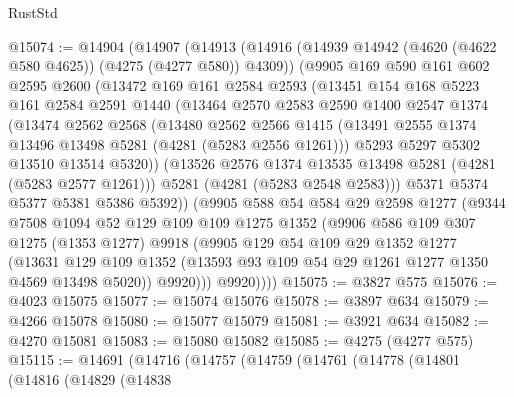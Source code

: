 \begin{lexlean}{RustStd}
\begin{coremodule}
@15074 := @14904
    (@14907
      (@14913
        (@14916 (@14939 @14942 (@4620 (@4622 @580 @4625)) (@4275 (@4277 @580)) @4309))
        (@9905
          @169
          @590
          @161
          @602
          @2595
          @2600
          (@13472
            @169
            @161
            @2584
            @2593
            (@13451
              @154
              @168
              @5223
              @161
              @2584
              @2591
              @1440
              (@13464
                @2570
                @2583
                @2590
                @1400
                @2547
                @1374
                (@13474
                  @2562
                  @2568
                  (@13480
                    @2562
                    @2566
                    @1415
                    (@13491 @2555 @1374 @13496 @13498 @5281 (@4281 (@5283 @2556 @1261)))
                    @5293
                    @5297
                    @5302
                    @13510
                    @13514
                    @5320))
                (@13526 @2576 @1374 @13535 @13498 @5281 (@4281 (@5283 @2577 @1261)))
                @5281
                (@4281 (@5283 @2548 @2583)))
              @5371
              @5374
              @5377
              @5381
              @5386
              @5392))
          (@9905
            @588
            @54
            @584
            @29
            @2598
            @1277
            (@9344
              @7508
              @1094
              @52
              @129
              @109
              @109
              @1275
              @1352
              (@9906
                @586
                @109
                @307
                @1275
                (@1353 @1277)
                @9918
                (@9905
                  @129
                  @54
                  @109
                  @29
                  @1352
                  @1277
                  (@13631
                    @129
                    @109
                    @1352
                    (@13593 @93 @109 @54 @29 @1261 @1277 @1350 @4569 @13498 @5020))
                  @9920)))
            @9920))))
@15075 := @3827 @575
@15076 := @4023 @15075
@15077 := @15074 @15076
@15078 := @3897 @634
@15079 := @4266 @15078
@15080 := @15077 @15079
@15081 := @3921 @634
@15082 := @4270 @15081
@15083 := @15080 @15082
@15085 := @4275 (@4277 @575)
@15115 := @14691
    (@14716
      (@14757
        (@14759
          (@14761
            (@14778
              (@14801
                (@14816
                  (@14829
                    (@14838

\end{coremodule}
\end{lexlean}
